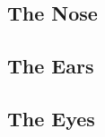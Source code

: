 \subsection{The Nose} %
\label{sub:the_nose}




\subsection{The Ears} %
\label{sub:the_ears}




\subsection{The Eyes} %
\label{sub:the_eyes}






